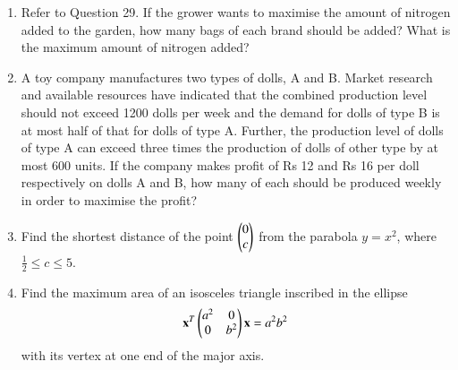 \begin{enumerate}[label=\arabic*.,ref=\thesection.\theenumi]
\item Refer to Question 29. If the grower wants to maximise the amount of nitrogen
added to the garden, how many bags of each brand should be added? What is
the maximum amount of nitrogen added?\\
\item A toy company manufactures two types of dolls, A and B. Market research and
available resources have indicated that the combined production level should not
exceed 1200 dolls per week and the demand for dolls of type B is at most half of that
for dolls of type A. Further, the production level of dolls of type A can exceed three
times the production of dolls of other type by at most 600 units. If the company
makes profit of Rs 12 and Rs 16 per doll respectively on dolls A and B, how many of
each should be produced weekly in order to maximise the profit?
\item Find the shortest distance of the point $\begin{pmatrix}0\\c\end{pmatrix}$ from the parabola $y = x^2$, where $\frac{1}{2} \le c \le 5$.
\item Find the maximum area of an isosceles triangle inscribed in the ellipse 
%
\begin{align}
\mathbf{x}^T\begin{pmatrix}a^2 & 0 \\ 0 & b^2\end{pmatrix}\mathbf{x} = a^2b^2
\end{align}
%
with its vertex at one end of the major axis.

\end{enumerate}
